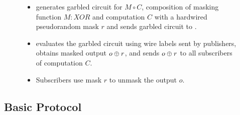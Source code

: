 \begin{figure}[h]
\begin{mdframed}[style=myframe]
\begin{itemize}[leftmargin=*]
	\item \garbler generates garbled circuit for $M \circ C$, composition of
		masking function $M:XOR$ and computation $C$ with a hardwired pseudorandom
		mask $r$ and sends garbled circuit to \broker.

	\item \broker evaluates the garbled circuit using wire labels sent by
		publishers, obtains masked output $o \oplus r$, and sends $o \oplus r$ to all
		subscribers of computation $C$.
  
	\item Subscribers use mask $r$ to unmask the output $o$.

\end{itemize}

\end{mdframed}
\end{figure}

\subsection{Basic Protocol}

